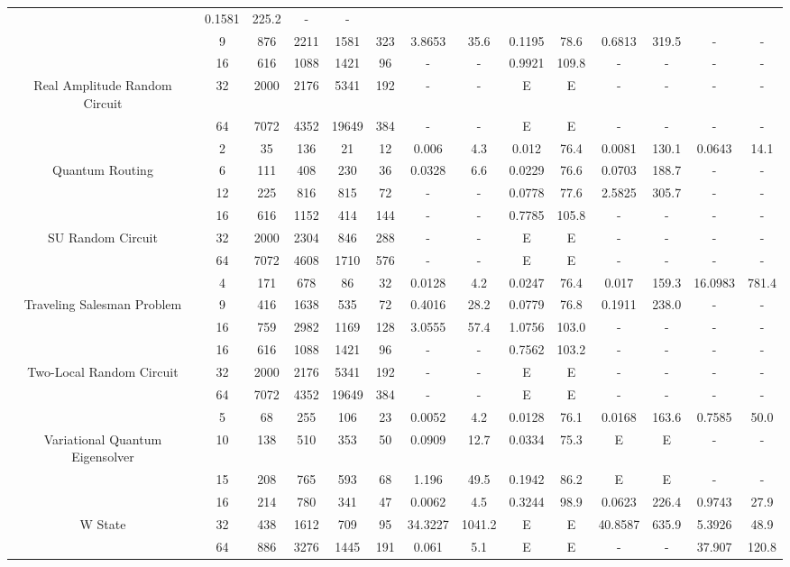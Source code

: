\begin{table}[htb]
{\begin{tabular}{|c|c|c|c|c|c|c|c|c|c|c|c|c|c|}
 & 0.1581 & 225.2
 & - & -
 \\
 & 
9 & 876 & 2211 & 1581 & 323
 & 3.8653 & 35.6
 & 0.1195 & 78.6
 & 0.6813 & 319.5
 & - & -
 \\
\hline
 & 
16 & 616 & 1088 & 1421 & 96
 & - & -
 & 0.9921 & 109.8
 & - & -
 & - & -
 \\
Real Amplitude Random Circuit & 
32 & 2000 & 2176 & 5341 & 192
 & - & -
 & E & E
 & - & -
 & - & -
 \\
 & 
64 & 7072 & 4352 & 19649 & 384
 & - & -
 & E & E
 & - & -
 & - & -
 \\
\hline
 & 
2 & 35 & 136 & 21 & 12
 & 0.006 & 4.3
 & 0.012 & 76.4
 & 0.0081 & 130.1
 & 0.0643 & 14.1
 \\
Quantum Routing & 
6 & 111 & 408 & 230 & 36
 & 0.0328 & 6.6
 & 0.0229 & 76.6
 & 0.0703 & 188.7
 & - & -
 \\
 & 
12 & 225 & 816 & 815 & 72
 & - & -
 & 0.0778 & 77.6
 & 2.5825 & 305.7
 & - & -
 \\
\hline
 & 
16 & 616 & 1152 & 414 & 144
 & - & -
 & 0.7785 & 105.8
 & - & -
 & - & -
 \\
SU Random Circuit & 
32 & 2000 & 2304 & 846 & 288
 & - & -
 & E & E
 & - & -
 & - & -
 \\
 & 
64 & 7072 & 4608 & 1710 & 576
 & - & -
 & E & E
 & - & -
 & - & -
 \\
\hline
 & 
4 & 171 & 678 & 86 & 32
 & 0.0128 & 4.2
 & 0.0247 & 76.4
 & 0.017 & 159.3
 & 16.0983 & 781.4
 \\
Traveling Salesman Problem & 
9 & 416 & 1638 & 535 & 72
 & 0.4016 & 28.2
 & 0.0779 & 76.8
 & 0.1911 & 238.0
 & - & -
 \\
 & 
16 & 759 & 2982 & 1169 & 128
 & 3.0555 & 57.4
 & 1.0756 & 103.0
 & - & -
 & - & -
 \\
\hline
 & 
16 & 616 & 1088 & 1421 & 96
 & - & -
 & 0.7562 & 103.2
 & - & -
 & - & -
 \\
Two-Local Random Circuit & 
32 & 2000 & 2176 & 5341 & 192
 & - & -
 & E & E
 & - & -
 & - & -
 \\
 & 
64 & 7072 & 4352 & 19649 & 384
 & - & -
 & E & E
 & - & -
 & - & -
 \\
\hline
 & 
5 & 68 & 255 & 106 & 23
 & 0.0052 & 4.2
 & 0.0128 & 76.1
 & 0.0168 & 163.6
 & 0.7585 & 50.0
 \\
Variational Quantum Eigensolver & 
10 & 138 & 510 & 353 & 50
 & 0.0909 & 12.7
 & 0.0334 & 75.3
 & E & E
 & - & -
 \\
 & 
15 & 208 & 765 & 593 & 68
 & 1.196 & 49.5
 & 0.1942 & 86.2
 & E & E
 & - & -
 \\
\hline
 & 
16 & 214 & 780 & 341 & 47
 & 0.0062 & 4.5
 & 0.3244 & 98.9
 & 0.0623 & 226.4
 & 0.9743 & 27.9
 \\
W State & 
32 & 438 & 1612 & 709 & 95
 & 34.3227 & 1041.2
 & E & E
 & 40.8587 & 635.9
 & 5.3926 & 48.9
 \\
 & 
64 & 886 & 3276 & 1445 & 191
 & 0.061 & 5.1
 & E & E
 & - & -
 & 37.907 & 120.8
 \\
\hline
\end{tabular}}
\end{table}